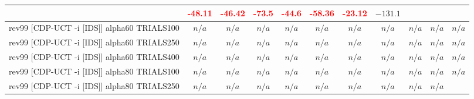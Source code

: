 \documentclass{article}
\begin{document}
\begin{tabular}{|l|r@{$\pm$}rr@{$\pm$}rr@{$\pm$}rr@{$\pm$}rr@{$\pm$}rr@{$\pm$}rr@{$\pm$}rr@{$\pm$}rr@{$\pm$}rr@{$\pm$}r|}
& \multicolumn{2}{c}{\textbf{\textcolor{red}{-48.11}}}
& \multicolumn{2}{c}{\textbf{\textcolor{red}{-46.42}}}
& \multicolumn{2}{c}{\textbf{\textcolor{red}{-73.5}}}
& \multicolumn{2}{c}{\textbf{\textcolor{red}{-44.6}}}
& \multicolumn{2}{c}{\textbf{\textcolor{red}{-58.36}}}
& \multicolumn{2}{c}{\textbf{\textcolor{red}{-23.12}}}
& \multicolumn{2}{c|}{$-131.1$}
\\
\hline
rev99 [CDP-UCT -i [IDS]] alpha60 TRIALS100
& \multicolumn{2}{c}{\textbf{$n/a$}}
& \multicolumn{2}{c}{\textbf{$n/a$}}
& \multicolumn{2}{c}{\textbf{$n/a$}}
& \multicolumn{2}{c}{\textbf{$n/a$}}
& \multicolumn{2}{c}{\textbf{$n/a$}}
& \multicolumn{2}{c}{\textbf{$n/a$}}
& \multicolumn{2}{c}{\textbf{$n/a$}}
& \multicolumn{2}{c}{\textbf{$n/a$}}
& \multicolumn{2}{c}{\textbf{$n/a$}}
& \multicolumn{2}{c|}{\textbf{$n/a$}}
\\
rev99 [CDP-UCT -i [IDS]] alpha60 TRIALS250
& \multicolumn{2}{c}{\textbf{$n/a$}}
& \multicolumn{2}{c}{\textbf{$n/a$}}
& \multicolumn{2}{c}{\textbf{$n/a$}}
& \multicolumn{2}{c}{\textbf{$n/a$}}
& \multicolumn{2}{c}{\textbf{$n/a$}}
& \multicolumn{2}{c}{\textbf{$n/a$}}
& \multicolumn{2}{c}{\textbf{$n/a$}}
& \multicolumn{2}{c}{\textbf{$n/a$}}
& \multicolumn{2}{c}{\textbf{$n/a$}}
& \multicolumn{2}{c|}{\textbf{$n/a$}}
\\
rev99 [CDP-UCT -i [IDS]] alpha60 TRIALS400
& \multicolumn{2}{c}{\textbf{$n/a$}}
& \multicolumn{2}{c}{\textbf{$n/a$}}
& \multicolumn{2}{c}{\textbf{$n/a$}}
& \multicolumn{2}{c}{\textbf{$n/a$}}
& \multicolumn{2}{c}{\textbf{$n/a$}}
& \multicolumn{2}{c}{\textbf{$n/a$}}
& \multicolumn{2}{c}{\textbf{$n/a$}}
& \multicolumn{2}{c}{\textbf{$n/a$}}
& \multicolumn{2}{c}{\textbf{$n/a$}}
& \multicolumn{2}{c|}{\textbf{$n/a$}}
\\
rev99 [CDP-UCT -i [IDS]] alpha80 TRIALS100
& \multicolumn{2}{c}{\textbf{$n/a$}}
& \multicolumn{2}{c}{\textbf{$n/a$}}
& \multicolumn{2}{c}{\textbf{$n/a$}}
& \multicolumn{2}{c}{\textbf{$n/a$}}
& \multicolumn{2}{c}{\textbf{$n/a$}}
& \multicolumn{2}{c}{\textbf{$n/a$}}
& \multicolumn{2}{c}{\textbf{$n/a$}}
& \multicolumn{2}{c}{\textbf{$n/a$}}
& \multicolumn{2}{c}{\textbf{$n/a$}}
& \multicolumn{2}{c|}{\textbf{$n/a$}}
\\
rev99 [CDP-UCT -i [IDS]] alpha80 TRIALS250
& \multicolumn{2}{c}{\textbf{$n/a$}}
& \multicolumn{2}{c}{\textbf{$n/a$}}
& \multicolumn{2}{c}{\textbf{$n/a$}}
& \multicolumn{2}{c}{\textbf{$n/a$}}
& \multicolumn{2}{c}{\textbf{$n/a$}}
& \multicolumn{2}{c}{\textbf{$n/a$}}
& \multicolumn{2}{c}{\textbf{$n/a$}}
& \multicolumn{2}{c}{\textbf{$n/a$}}
& \multicolumn{2}{c}{\textbf{$n/a$}}

\end{tabular}
\end{document}
